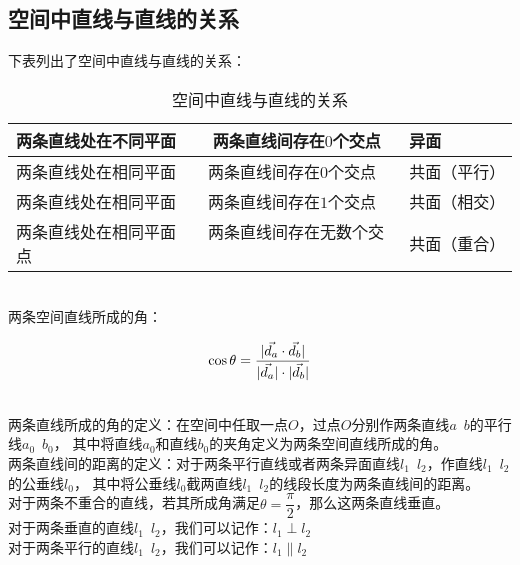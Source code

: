 \documentclass[UTF8]{ctexart}
\let\nvec\vec
\def\vec#1{\nvec{\vphantom b\smash{#1}}}
\begin{document}
\subsection{空间中直线与直线的关系}
    下表列出了空间中直线与直线的关系：
    \begin{table}[h]
        \begin{center}
            \begin{tabular}{l|l}
                \hline
                两条直线处在不同平面~~~~两条直线间存在$0$个交点&异面\\ \hline
                两条直线处在相同平面~~~~两条直线间存在$0$个交点&共面（平行）\\ \hline
                两条直线处在相同平面~~~~两条直线间存在$1$个交点&共面（相交）\\ \hline
                两条直线处在相同平面~~~~两条直线间存在无数个交点&共面（重合）\\ \hline
            \end{tabular}
            \caption{空间中直线与直线的关系}
        \end{center}
    \end{table}\\
    两条空间直线所成的角：
    \begin{large}
        \begin{equation*}
            \cos{\theta}=\frac{|\vec{d_a}\cdot\vec{d_b}|}{|\vec{d_a}|\cdot|\vec{d_b}|}
        \end{equation*}
    \end{large}\\
    两条直线所成的角的定义：在空间中任取一点$O$，过点$O$分别作两条直线$a$~$b$的平行线$a_{0}$~$b_{0}$，
    其中将直线$a_{0}$和直线$b_{0}$的夹角定义为两条空间直线所成的角。\\[3mm]
    两条直线间的距离的定义：对于两条平行直线或者两条异面直线$l_1$~$l_2$，作直线$l_1$~$l_2$的公垂线$l_0$，
    其中将公垂线$l_0$截两直线$l_1$~$l_2$的线段长度为两条直线间的距离。\\[5mm]
    对于两条不重合的直线，若其所成角满足$\theta=\dfrac{\pi}{2}$，那么这两条直线垂直。\\[3mm]
    对于两条垂直的直线$l_1$~$l_2$，我们可以记作：$l_1\perp l_2$\\[3mm]
    对于两条平行的直线$l_1$~$l_2$，我们可以记作：$l_1\parallel l_2$
\end{document}
